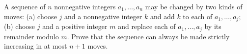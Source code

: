 A sequence of $n$ nonnegative integers $a_1,\dots,a_n$ may be changed by two kinds of moves: (a) choose $j$ and a nonnegative integer $k$ and add $k$ to each of $a_1,\dots,a_j$; (b) choose $j$ and a positive integer $m$ and replace each of $a_1,\dots,a_j$ by its remainder modulo $m$. Prove that the sequence can always be made strictly increasing in at most $n+1$ moves.
